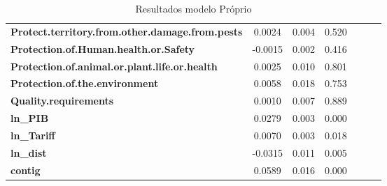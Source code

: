 \begin{table}[ht]
\begin{center}
\begin{tabular}{lcccccc}
\textbf{Protect.territory.from.other.damage.from.pests}            &       0.0024  &        0.004     &        0.520       \\
\textbf{Protection.of.Human.health.or.Safety}                      &      -0.0015  &        0.002     &        0.416       \\
\textbf{Protection.of.animal.or.plant.life.or.health}              &       0.0025  &        0.010     &        0.801       \\
\textbf{Protection.of.the.environment}                             &       0.0058  &        0.018     &        0.753       \\
\textbf{Quality.requirements}                                      &       0.0010  &        0.007     &        0.889       \\
\textbf{ln\_PIB}                                                   &       0.0279  &        0.003     &        0.000       \\
\textbf{ln\_Tariff}                                                &       0.0070  &        0.003     &        0.018       \\
\textbf{ln\_dist}                                                  &      -0.0315  &        0.011     &        0.005       \\
\textbf{contig}                                                    &       0.0589  &        0.016     &        0.000       \\

\bottomrule
\end{tabular}
\caption{Resultados modelo Próprio}
\end{center}
\end{table}